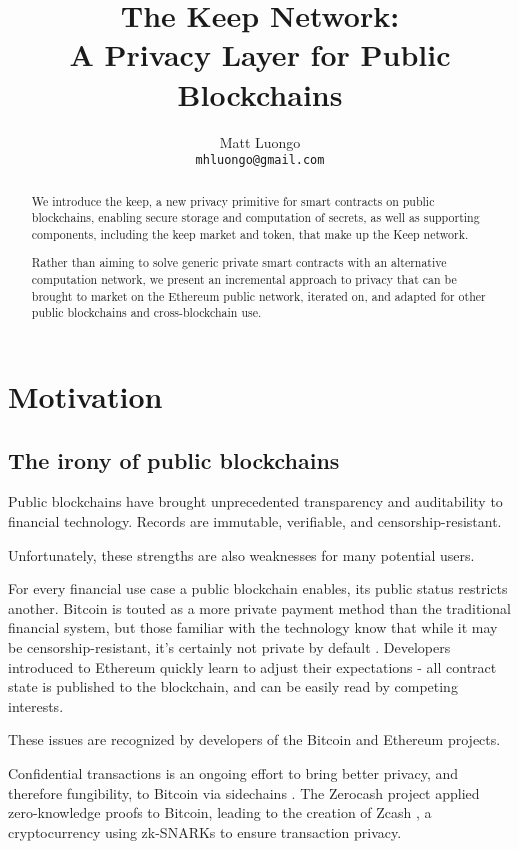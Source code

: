 \documentclass[11pt]{article}
\title{The Keep Network:\protect\\A Privacy Layer for Public Blockchains}
\author{Matt Luongo \\
  {\tt mhluongo@gmail.com}}
\date{}
\begin{document}
 \maketitle \begin{abstract}

  We introduce the keep, a new privacy primitive for smart contracts
  on public blockchains, enabling secure storage and computation of
  secrets, as well as supporting components, including the keep market
  and token, that make up the Keep network.

  Rather than aiming to solve generic private smart contracts with an
  alternative computation network, we present an incremental approach
  to privacy that can be brought to market on the Ethereum public
  network, iterated on, and adapted for other public blockchains and
  cross-blockchain use.

\end{abstract}

\section{Motivation}

\subsection{The irony of public blockchains}

Public blockchains have brought unprecedented transparency and
auditability to financial technology. Records are immutable,
verifiable, and censorship-resistant.

Unfortunately, these strengths are also weaknesses for many potential
users.

For every financial use case a public blockchain enables, its public
status restricts another. Bitcoin is touted as a more private payment
method than the traditional financial system, but those familiar with
the technology know that while it may be censorship-resistant, it's
certainly not private by default \cite{bitcoinPrivacy}. Developers
introduced to Ethereum quickly learn to adjust their expectations
\cite{ethereumStackexchange}- all contract state is published to the
blockchain, and can be easily read by competing interests.

These issues are recognized by developers of the Bitcoin and Ethereum
projects.

Confidential transactions \cite{confidentialTransactions} is an
ongoing effort to bring better privacy, and therefore fungibility, to
Bitcoin via sidechains \cite{confidentialTransactionsElements}. The
Zerocash project \cite{zerocash} applied zero-knowledge proofs to
Bitcoin, leading to the creation of Zcash \cite{zcash}, a
cryptocurrency using zk-SNARKs to ensure transaction privacy.
\end{document}
